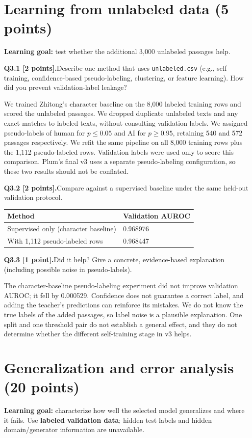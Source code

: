 \documentclass[11pt,letterpaper]{article}
\newcommand{\question}[2]{\needspace{4\baselineskip}\par\addvspace{0.45em}\noindent\textbf{#1}\quad #2\par\nobreak\vspace{0.1em}}
\begin{document}
\section{Learning from unlabeled data (5 points)}
\textbf{Learning goal:} test whether the additional 3,000 unlabeled passages help.
\question{Q3.1 [2 points].}{Describe one method that uses \texttt{unlabeled.csv} (e.g., self-training, confidence-based pseudo-labeling, clustering, or feature learning). How did you prevent validation-label leakage?}
We trained Zhitong's character baseline on the 8,000 labeled training rows and scored the unlabeled passages. We dropped duplicate unlabeled texts and any exact matches to labeled texts, without consulting validation labels. We assigned pseudo-labels of human for $p\leq0.05$ and AI for $p\geq0.95$, retaining 540 and 572 passages respectively. We refit the same pipeline on all 8,000 training rows plus the 1,112 pseudo-labeled rows. Validation labels were used only to score this comparison. Plum's final v3 uses a separate pseudo-labeling configuration, so these two results should not be conflated.
\question{Q3.2 [2 points].}{Compare against a supervised baseline under the same held-out validation protocol.}
\begin{tabularx}{\linewidth}{@{}Yp{1.5in}@{}}\toprule Method & Validation AUROC \\ \midrule Supervised only (character baseline) & 0.968976 \\ With 1,112 pseudo-labeled rows & 0.968447 \\ \bottomrule\end{tabularx}
\question{Q3.3 [1 point].}{Did it help? Give a concrete, evidence-based explanation (including possible noise in pseudo-labels).}
The character-baseline pseudo-labeling experiment did not improve validation AUROC; it fell by 0.000529. Confidence does not guarantee a correct label, and adding the teacher's predictions can reinforce its mistakes. We do not know the true labels of the added passages, so label noise is a plausible explanation. One split and one threshold pair do not establish a general effect, and they do not determine whether the different self-training stage in v3 helps.
\newpage
\section{Generalization and error analysis (20 points)}
\textbf{Learning goal:} characterize how well the selected model generalizes and where it fails. Use \textbf{labeled validation data}; hidden test labels and hidden domain/generator information are unavailable.
\end{document}
